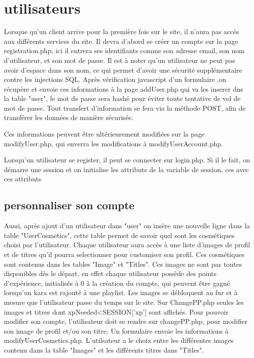 \section{utilisateurs}

Lorsque qu'un client arrive pour la première fois sur le site, il n'aura pas accès aux différents services du site. Il devra d'abord se créer un compte sur la page registration.php, ici il entrera ses 
identifiants comme son adresse email, son nom d'utilisateur, et son mot de passe.\newline
Il est à noter qu'un utilisateur ne peut pas avoir d'espace dans son nom, ce qui permet d'avoir une sécurité supplémentaire contre les injections SQL.\newline
Après vérification javascript d'un formulaire ,on récupère et envoie ces informations à la page addUser.php qui va les inserer dns la table "user", le mot de passe sera hashé pour éviter toute tentative de vol de mot de passe. Tout transfert d'information se fera via la méthode POST, afin de transférer les données de manière sécurisée.
\newline

Ces informations peuvent être  ultérieurement modifiées sur la page modifyUser.php, qui enverra les modifications à modifyUserAccount.php.\newline

Lorsqu'un utilisateur se register, il peut se connecter sur login.php. Si il le fait, on démarre une session et on initialise les attributs de la variable de session, ces avec ces attributs 

\subsection{personnaliser son compte}

Aussi, après ajout d'un utilisateur dans "user" on insère une nouvelle ligne dans la table "UserCosmetics", cette table permet de savoir quel sont les cosmétiques choisi par l'utilisateur.  
Chaque utilisateur aura accès à une liste d'images de profil et de titres qu'il pourra selectionner pour customiser son profil. Ces cosmétiques sont contenus dans les tables "Image" et "Titles". 
\newline
Ces images ne sont pas toutes disponibles dès le départ, en effet chaque utilisateur possède des points d'expérience, initialisés à 0 à la création du compte, qui peuvent être gagné lorsqu'un kara est rajouté à une playlist. Les images se débloquent au fur et à mesure que l'utilisateur passe du temps sur le site. Sur ChangePP.php seules les images et titres dont xpNeeded<SESSION['xp'] sont affichés.\newline
Pour pouvoir modifier son compte, l'utilisateur doit se rendre sur changePP.php, pour modifier son image de profil et/ou son titre. Un formulaire envoie les informations à modifyUserCosmetics.php. L'utilsateur a le choix entre les différentes images contenu dans la table "Images" et les différents titres dans "Titles". \newline

